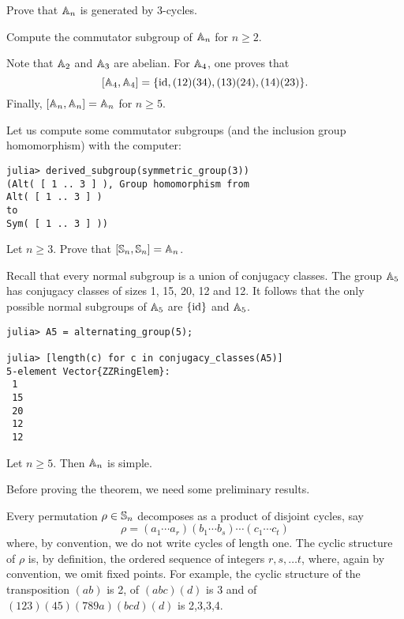 \begin{exercise}
    Prove that $\mathbb{A}_n$ is generated by 3-cycles. 
\end{exercise}

\begin{exercise}
    Compute the commutator subgroup of $\mathbb{A}_n$ for
    $n\geq2$. 
\end{exercise}

Note that $\mathbb{A}_2$ and $\mathbb{A}_3$ are abelian. 
For $\mathbb{A}_4$, one proves that 
\[
[\mathbb{A}_4,\mathbb{A}_4]=\{\operatorname{id},(12)(34),(13)(24),(14)(23)\}.
\]
Finally, $[\mathbb{A}_n,\mathbb{A}_n]=\mathbb{A}_n$ for $n\geq5$. 

Let us compute some commutator subgroups (and the inclusion group homomorphism)  
with the computer:
\begin{lstlisting}
julia> derived_subgroup(symmetric_group(3))
(Alt( [ 1 .. 3 ] ), Group homomorphism from 
Alt( [ 1 .. 3 ] )
to
Sym( [ 1 .. 3 ] ))    
\end{lstlisting}

\begin{exercise}
    Let $n\geq3$. 
    Prove that $[\mathbb{S}_n,\mathbb{S}_n]=\mathbb{A}_n$. 
\end{exercise}

Recall that every normal subgroup is a union of conjugacy classes. The group 
$\mathbb{A}_5$ has conjugacy classes of sizes 1, 15, 20, 12 and 12. It follows that 
the only possible normal subgroups of $\mathbb{A}_5$ are $\{\operatorname{id}\}$ and $\mathbb{A}_5$. 
\begin{lstlisting}
julia> A5 = alternating_group(5);

julia> [length(c) for c in conjugacy_classes(A5)]
5-element Vector{ZZRingElem}:
 1
 15
 20
 12
 12 
\end{lstlisting}

\begin{theorem}[Jordan]
\label{thm:Jordan}
    Let $n\geq5$. Then $\mathbb{A}_n$ is simple. 
\end{theorem}

Before proving the theorem, we need some preliminary results.

Every permutation $\rho\in\mathbb{S}_n$ decomposes as a product of disjoint cycles, say
\[
\rho=(a_1\cdots a_r)(b_1\cdots b_s)\cdots (c_1\cdots c_t)
\]
where, by convention, we do not write cycles of length one. 
The cyclic structure of $\rho$ is, by definition, the ordered 
sequence of integers $r,s,\dots t$, where, again by convention,  
we omit fixed points. For example, the cyclic structure of 
the transposition $(ab)$ is 2, 
of $(abc)(d)$ is 3 and of $(123)(45)(789a)(bcd)(d)$ is 2,3,3,4. 

